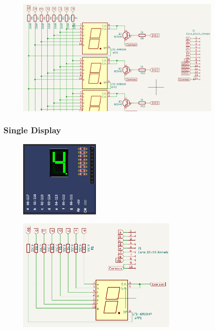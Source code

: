 \begin{figure}[H]
\center
\includegraphics[width=0.9\textwidth]{img/part_7seg_.png} 
\end{figure} 


\subsubsection{Single Display}
\begin{figure}[H]
\center
\includegraphics[width=0.35\textwidth]{img/part_7seg1.png} 
\end{figure} 

\begin{figure}[H]
\center
\includegraphics[width=0.7\textwidth]{img/part_7seg1_.png} 
\end{figure} 


